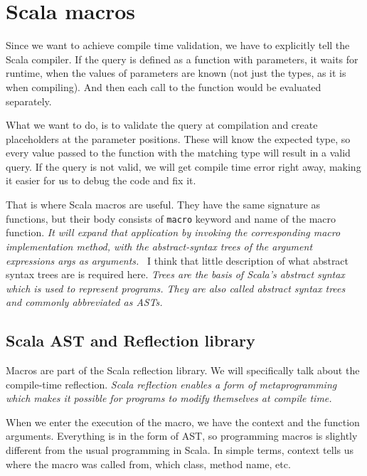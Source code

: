 \section{Scala macros}
Since we want to achieve compile time validation, we have to explicitly tell the Scala compiler. If the query is defined as a function with parameters, it waits for runtime, when the values of parameters are known (not just the types, as it is when compiling). And then each call to the function would be evaluated separately.

What we want to do, is to validate the query at compilation and create placeholders at the parameter positions. These will know the expected type, so every value passed to the function with the matching type will result in a valid query. If the query is not valid, we will get compile time error right away, making it easier for us to debug the code and fix it.

That is where Scala macros are useful. They have the same signature as functions, but their body consists of \texttt{macro} keyword and name of the macro function.  \textit{It will expand that application by invoking the corresponding macro implementation method, with the abstract-syntax trees of the argument expressions args as arguments.}~\cite{Def macros} I think that little description of what abstract syntax trees are is required here. \textit{Trees are the basis of Scala’s abstract syntax which is used to represent programs. They are also called abstract syntax trees and commonly abbreviated as ASTs.}\cite{Trees}

\subsection{Scala AST and Reflection library}
Macros are part of the Scala reflection library. We will specifically talk about the compile-time reflection. \textit{Scala reflection enables a form of metaprogramming which makes it possible for programs to modify themselves at compile time.}\cite{Compile-time reflection} 

When we enter the execution of the macro, we have the context and the function arguments. Everything is in the form of AST, so programming macros is slightly different from the usual programming in Scala. In simple terms, context tells us where the macro was called from, which class, method name, etc. 

